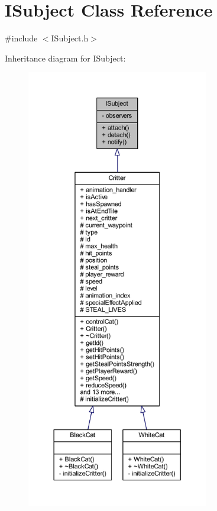 \hypertarget{class_i_subject}{\section{I\+Subject Class Reference}
\label{class_i_subject}
}


{\ttfamily \#include $<$I\+Subject.\+h$>$}



Inheritance diagram for I\+Subject\+:
\nopagebreak
\begin{figure}[H]
\begin{center}
\leavevmode
\includegraphics[height=550pt]{class_i_subject__inherit__graph}
\end{center}
\end{figure}



